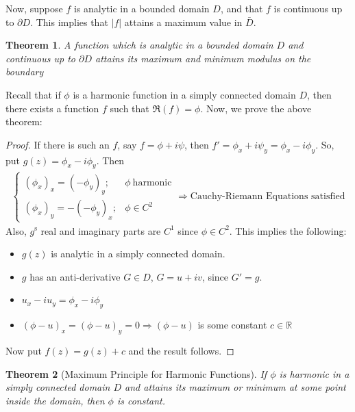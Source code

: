 \documentclass[12pt, a4paper]{article}
\theoremstyle{plain}
\newtheorem{thm}{Theorem} %
\theoremstyle{definition}
\begin{document}
			Now, suppose $f$ is analytic in a bounded domain $D$, and that $f$ is continuous up to $\partial D$. This implies that $|f|$ attains a maximum value in $\bar{D}$.\\

			\begin{thm}
				A function which is analytic in a bounded domain $D$ and continuous up to $\partial D$ attains its maximum and minimum modulus on the boundary\\
			\end{thm}

			Recall that if $\phi$ is a harmonic function in a simply connected domain $D$, then there exists a function $f$ such that $\Re(f)=\phi$. Now, we prove the above theorem:

			\begin{proof}
				If there is such an $f$, say $f=\phi+i\psi$, then $f' = \phi_x+i\psi_y = \phi_x-i\phi_y$. So, put $g(z) = \phi_x - i\phi_y$. Then
				\begin{align*}
					\begin{cases}
						(\phi_x)_x = (-\phi_y)_y; & \phi\: \mathrm{harmonic}\\
						(\phi_x)_y = -(-\phi_y)_x; &\phi\in C^2
					\end{cases}\Rightarrow
					\text{Cauchy-Riemann Equations satisfied}
				\end{align*}
				Also, $g^{\mathrm{s}}$ real and imaginary parts are $C^1$ since $\phi\in C^2$. This implies the following:
				\begin{itemize}
					\item $g(z)$ is analytic in a simply connected domain.
					\item $g$ has an anti-derivative $G\in D$, $G=u+iv$, since $G'=g$.
					\item $u_x-iu_y = \phi_x-i\phi_y$
					\item $(\phi-u)_x = (\phi-u)_y=0\Rightarrow (\phi-u)$ is some constant $c\in \mathbb{R}$
				\end{itemize}
				Now put $f(z)=g(z)+c$ and the result follows.
			\end{proof}

			\begin{thm}[Maximum Principle for Harmonic Functions]
			\label{thm:harmonic_maximum_principle}
				If $\phi$ is harmonic in a simply connected domain $D$ and attains its maximum or minimum at some point inside the domain, then $\phi$ is constant.
			\end{thm}
\end{document}
